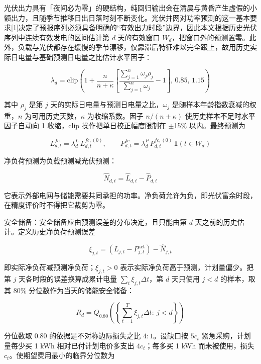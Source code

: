 \documentclass[12pt,a4paper]{ctexart}
\begin{document}
光伏出力具有「夜间必为零」的硬结构，纯回归输出会在清晨与黄昏产生虚假的小额出力，且随季节推移日出日落时刻不断变化。光伏并网对功率预测的这一基本要求[1]决定了预报序列必须具备明确的``有效出力时段''边界，因此本文根据历史光伏序列中连续有效发电的区间估计第 $d$ 天的有效窗口 $W_d$，把窗口外的预测置零。此外，负载与光伏都存在缓慢的季节漂移，仅靠滞后特征难以完全跟上，故用历史实际日电量与基础预测日电量之比估计水平因子：

\begin{equation}
\lambda_d=\mathrm{clip}\left(1+\frac{n}{n+\kappa}\left[\frac{\sum_{j=1}^{n}\omega_j\rho_j}{\sum_{j=1}^{n}\omega_j}-1\right],\,0.85,\,1.15\right)
\end{equation}

其中 $\rho_j$ 是第 $j$ 天的实际日电量与预测日电量之比，$\omega_j$ 是随样本年龄指数衰减的权重，$n$ 为可用历史天数，$\kappa$ 为收缩系数。因子 $n/(n+\kappa)$ 使历史样本不足时水平因子自动向 1 收缩，$\mathrm{clip}$ 操作把单日校正幅度限制在 $\pm$15\% 以内。最终预测为

\begin{equation}
L_{d,t}^{fc}=\lambda_d^{L}\,L_{d,t}^{fc,(0)},\qquad P_{d,t}^{fc}=\lambda_d^{P}\,P_{d,t}^{fc,(0)}\,\mathbf{1}(t\in W_d)
\end{equation}

净负荷预测为负载预测减光伏预测：

\begin{equation}
\widehat{N}_{d,t}=\widehat{L}_{d,t}-\widehat{P}_{d,t}
\end{equation}

它表示外部电网与储能需要共同承担的功率。净负荷允许为负，即光伏富余时段，在精度评价时不得把它裁剪为零。

安全储备：安全储备应由预测误差的分布决定，且只能由第 $d$ 天之前的历史估计。定义历史净负荷预测误差

\begin{equation}
\xi_{j,t}=\left(L_{j,t}-P_{j,t}^{\mathrm{act}}\right)-\widehat{N}_{j,t}
\end{equation}

即实际净负荷减预测净负荷；$\xi_{j,t}>0$ 表示实际净负荷高于预测，计划量偏少。把第 $j$ 天各时段的误差换算成累计电量 $\sum_t \xi_{j,t}\Delta t$，第 $d$ 天只使用 $j<d$ 的样本，取其 80\% 分位数作为当天的储能安全储备：

\begin{equation}
R_d=Q_{0.80}\left(\left\{\sum_{t=1}^{T}\xi_{j,t}\Delta t:\ j<d\right\}\right)
\end{equation}

分位数取 0.80 的依据是不对称边际损失之比 $4:1$。设缺口按 $5c_t$ 紧急采购，计划量每少买 1 kWh 相对已付计划电价多支出 $4c_t$；每多买 1 kWh 而未被使用，损失 $c_t$。使期望费用最小的临界分位数为
\end{document}
